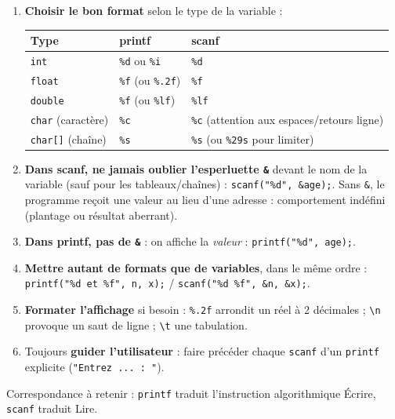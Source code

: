 \documentclass[11pt]{article}
\newcommand{\cle}[1]{{\popxbold\color{popdark}#1}}
\begin{document}
\begin{methode}
\begin{enumerate}
\item \textbf{Choisir le bon format} selon le type de la variable :
\begin{center}
\begin{tabular}{|l|l|l|}
\hline
\rowcolor{popblueL} \textbf{Type} & \textbf{printf} & \textbf{scanf} \\
\hline
\texttt{int} & \texttt{\%d} ou \texttt{\%i} & \texttt{\%d} \\
\texttt{float} & \texttt{\%f} (ou \texttt{\%.2f}) & \texttt{\%f} \\
\texttt{double} & \texttt{\%f} (ou \texttt{\%lf}) & \texttt{\%lf} \\
\texttt{char} (caractère) & \texttt{\%c} & \texttt{\%c} (attention aux espaces/retours ligne) \\
\texttt{char[]} (chaîne) & \texttt{\%s} & \texttt{\%s} (ou \texttt{\%29s} pour limiter) \\
\hline
\end{tabular}
\end{center}
\item \textbf{Dans scanf, ne jamais oublier l'esperluette \texttt{\&}} devant le nom de la variable (sauf pour les tableaux/chaînes) : \texttt{scanf("\%d", \&age);}. Sans \texttt{\&}, le programme reçoit une valeur au lieu d'une adresse : comportement indéfini (plantage ou résultat aberrant).
\item \textbf{Dans printf, pas de \texttt{\&}} : on affiche la \emph{valeur} : \texttt{printf("\%d", age);}.
\item \textbf{Mettre autant de formats que de variables}, dans le même ordre : \texttt{printf("\%d et \%f", n, x);} / \texttt{scanf("\%d \%f", \&n, \&x);}.
\item \textbf{Formater l'affichage} si besoin : \texttt{\%.2f} arrondit un réel à 2 décimales ; \texttt{\textbackslash n} provoque un saut de ligne ; \texttt{\textbackslash t} une tabulation.
\item Toujours \textbf{guider l'utilisateur} : faire précéder chaque \texttt{scanf} d'un \texttt{printf} explicite (\texttt{"Entrez ... : "}).
\end{enumerate}
Correspondance à retenir : \texttt{printf} traduit l'instruction algorithmique \cle{Écrire}, \texttt{scanf} traduit \cle{Lire}.
\end{methode}
\end{document}
